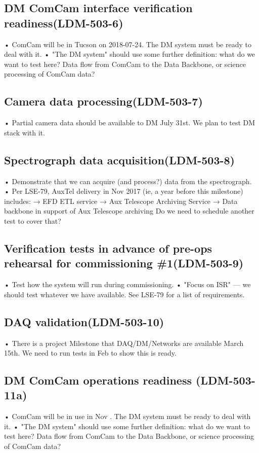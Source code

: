 \subsection{ DM ComCam interface verification readiness\textbf{(LDM-503-6)}\label{LDM-503-6}}
• ComCam will be in Tucson on 2018-07-24. The DM system must be ready to deal with it.
 \newline• "The DM system" should use some further definition: what do we want to test here? Data flow from ComCam to the Data Backbone, or science processing of ComCam data?
\subsection{ Camera data processing\textbf{(LDM-503-7)}\label{LDM-503-7}}
• Partial camera data should be available to DM July 31st. We plan to test DM stack with it.
 \newline
\subsection{ Spectrograph data acquisition\textbf{(LDM-503-8)}\label{LDM-503-8}}
• Demonstrate that we can acquire (and process?) data from the spectrograph.
 \newline• Per LSE-79, AuxTel delivery in Nov 2017 (ie, a year before this milestone) includes: → EFD ETL service → Aux Telescope Archiving Service → Data backbone in support of Aux Telescope archiving Do we need to schedule another test to cover that?
\subsection{Verification tests in advance of pre-ops rehearsal for commissioning \#1\textbf{(LDM-503-9)}\label{LDM-503-9}}
• Test how the system will run during commissioning.
 \newline• "Focus on ISR" — we should test whatever we have available. See LSE-79 for a list of requirements.
\subsection{ DAQ validation\textbf{(LDM-503-10)}\label{LDM-503-10}}
• There is a project Milestone that DAQ/DM/Networks are available March 15th. We need to run tests in Feb to show this is ready.
 \newline
\subsection{ DM ComCam operations readiness \textbf{(LDM-503-11a)}\label{LDM-503-11a}}
• ComCam will be in use in Nov . The DM system must be ready to deal with it.
 \newline• "The DM system" should use some further definition: what do we want to test here? Data flow from ComCam to the Data Backbone, or science processing of ComCam data?
